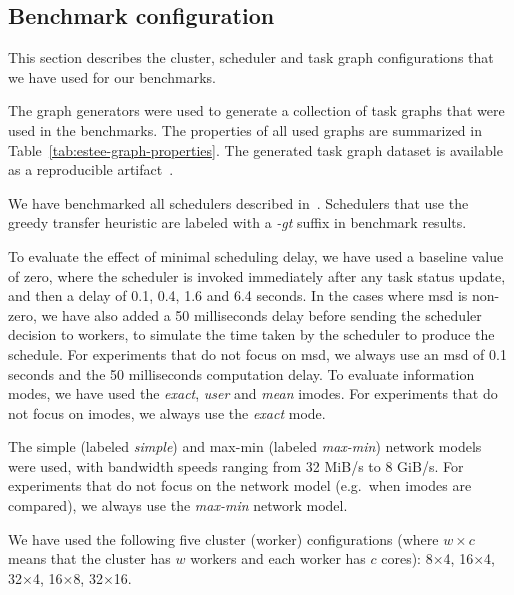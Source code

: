 \subsection{Benchmark configuration}
This section describes the cluster, scheduler and task graph configurations that we have used for
our benchmarks.

\begin{description}[wide=0pt]
	\item[Task graphs] The \estee{} graph generators were used to generate a collection of task graphs that
		were used in the benchmarks. The properties of all used graphs are summarized in
		Table~\ref{tab:estee-graph-properties}. The generated task graph dataset is available as a reproducible
		artifact~\cite{estee_graphs}.
	\item[Schedulers] We have benchmarked all schedulers described in~. Schedulers that use the
		greedy transfer heuristic are labeled with a \emph{-gt} suffix in benchmark results.
	\item[Scheduler parameters] To evaluate the effect of minimal scheduling delay, we have used a baseline value of zero, where
		the scheduler is invoked immediately after any task status update, and then a delay of 0.1, 0.4,
		1.6 and 6.4 seconds. In the cases where \gls{msd} is non-zero, we have also added a 50
		milliseconds delay before sending the scheduler decision to workers, to simulate the time taken by
		the scheduler to produce the schedule. For experiments that do not focus on \gls{msd},
		we always use an \gls{msd} of 0.1 seconds and the 50 milliseconds computation delay.
		To evaluate information modes, we have used the \emph{exact}, \emph{user} and
		\emph{mean} imodes. For experiments that do not focus on imodes, we always use the
		\emph{exact} mode.
	\item[Network models] The simple (labeled \emph{simple}) and max-min (labeled \emph{max-min}) network
		models were used, with bandwidth speeds ranging from 32 MiB/s to 8 GiB/s. For experiments that do
		not focus on the network model (e.g.\ when imodes are compared), we always use the
		\emph{max-min} network model.
	\item[Clusters] We have used the following five cluster (worker) configurations (where $w \times c$ means
		that the cluster has $w$ workers and each worker has $c$
		cores):  8$\times$4, 16$\times$4, 32$\times$4,
		16$\times$8, 32$\times$16.
\end{description}

